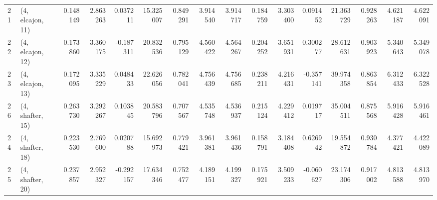 \begin{tabular}{llrrrrrrrrrrrrrr}
21 &  (4, elcajon, 11) &   0.148149 &  2.863263 &  0.037211 &  15.325007 &  0.849291 &   3.914540 &  3.914717 &  0.184759 &  3.303400 &  0.091452 &   21.363729 &  0.928263 &   4.621187 &   4.622091 \\
22 &  (4, elcajon, 12) &   0.173860 &  3.360175 & -0.187311 &  20.832536 &  0.795129 &   4.560422 &  4.564267 &  0.204252 &  3.651931 &  0.300277 &   28.612631 &  0.903923 &   5.340643 &   5.349078 \\
23 &  (4, elcajon, 13) &   0.172095 &  3.335229 &  0.048433 &  22.626056 &  0.782041 &   4.756439 &  4.756685 &  0.238211 &  4.216431 & -0.357141 &   39.974358 &  0.863854 &   6.312433 &   6.322528 \\
26 &  (4, shafter, 15) &   0.263730 &  3.292267 &  0.103845 &  20.583796 &  0.707567 &   4.535748 &  4.536937 &  0.215124 &  4.229412 &  0.019717 &   35.004511 &  0.875568 &   5.916428 &   5.916461 \\
24 &  (4, shafter, 18) &   0.223530 &  2.769600 &  0.020788 &  15.692973 &  0.779421 &   3.961381 &  3.961436 &  0.158791 &  3.184408 &  0.626942 &   19.554872 &  0.930784 &   4.377421 &   4.422089 \\
25 &  (4, shafter, 20) &   0.237857 &  2.952327 & -0.292157 &  17.634346 &  0.752477 &   4.189151 &  4.199327 &  0.175921 &  3.509233 & -0.060627 &   23.174306 &  0.917002 &   4.813588 &   4.813970 \\
\bottomrule
\end{tabular}
